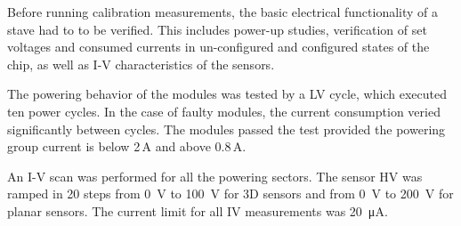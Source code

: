 Before running calibration measurements, the basic electrical functionality of a stave had to to be verified. This includes power-up studies, verification of set voltages and consumed currents in un-configured and configured states of the chip, as well as I-V characteristics of the sensors.


The powering behavior of the modules was tested by a LV cycle, which executed ten power cycles. In the case of faulty modules, the current consumption veried significantly between cycles. %
The modules passed the test provided the powering group current is below 2\,A and above 0.8\,A.

An I-V scan was performed for all the powering sectors. The sensor HV was ramped in 20 steps from \SI{0}{\volt} to \SI{100}{\volt} for 3D sensors and from \SI{0}{\volt} to \SI{200}{\volt} for planar sensors. The current limit for all IV measurements was \SI{20}{\micro\ampere}.

